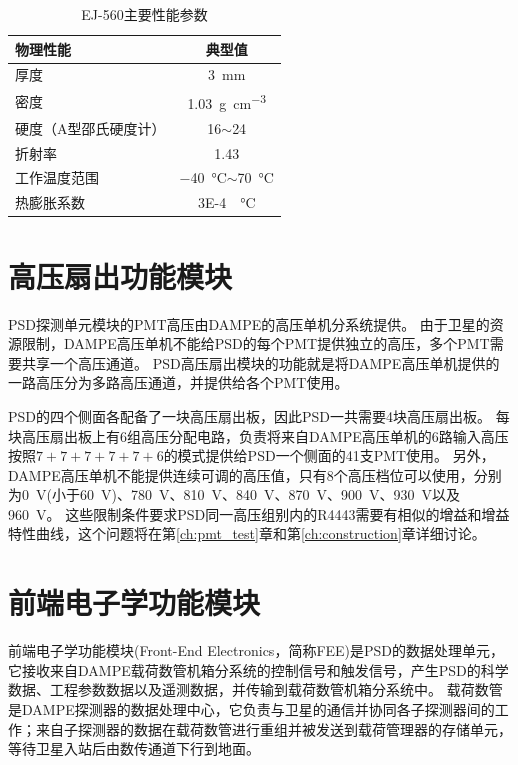 \begin{table}[htb]
	\centering
	\caption{EJ-560主要性能参数}
	\label{tab:description:ej560}
	
	\begin{tabulary}{0.6\linewidth}{LC}
		\toprule[1.5pt]
		\textbf{物理性能} & \textbf{典型值}                              \\ 
		\midrule[1pt]
		厚度            & \SI{3}{\milli\meter}                      \\
		密度            & \SI{1.03}{\g\per\cubic\centi\meter}       \\
		硬度（A型邵氏硬度计）   & 16$\sim$24                                \\
		折射率           & 1.43                                      \\
		工作温度范围        & \SI{-40}{\celsius}$\sim$\SI{70}{\celsius} \\
		热膨胀系数         & \SI{3E-4}{\per\celsius}                   \\ 
		\bottomrule[1.5pt]
	\end{tabulary}
	
\end{table}

\section{高压扇出功能模块}
\label{sec:description:psd_hv}
PSD探测单元模块的PMT高压由DAMPE的高压单机分系统提供。
由于卫星的资源限制，DAMPE高压单机不能给PSD的每个PMT提供独立的高压，多个PMT需要共享一个高压通道。
PSD高压扇出模块的功能就是将DAMPE高压单机提供的一路高压分为多路高压通道，并提供给各个PMT使用。

PSD的四个侧面各配备了一块高压扇出板，因此PSD一共需要4块高压扇出板。
每块高压扇出板上有6组高压分配电路，负责将来自DAMPE高压单机的6路输入高压按照$7+7+7+7+7+6$的模式提供给PSD一个侧面的41支PMT使用。
另外，DAMPE高压单机不能提供连续可调的高压值，只有8个高压档位可以使用，分别为\SI{0}{V}(小于\SI{60}{V})、\SI{780}{V}、\SI{810}{V}、\SI{840}{V}、\SI{870}{V}、\SI{900}{V}、\SI{930}{V}以及\SI{960}{\volt}。
这些限制条件要求PSD同一高压组别内的R4443需要有相似的增益和增益特性曲线，这个问题将在第\ref{ch:pmt_test}章和第\ref{ch:construction}章详细讨论。

\section{前端电子学功能模块}
\label{sec:description:psd_electronics}
前端电子学功能模块(Front-End Electronics，简称FEE)是PSD的数据处理单元，它接收来自DAMPE载荷数管机箱分系统的控制信号和触发信号，产生PSD的科学数据、工程参数数据以及遥测数据，并传输到载荷数管机箱分系统中。
载荷数管是DAMPE探测器的数据处理中心，它负责与卫星的通信并协同各子探测器间的工作；来自子探测器的数据在载荷数管进行重组并被发送到载荷管理器的存储单元，等待卫星入站后由数传通道下行到地面。

